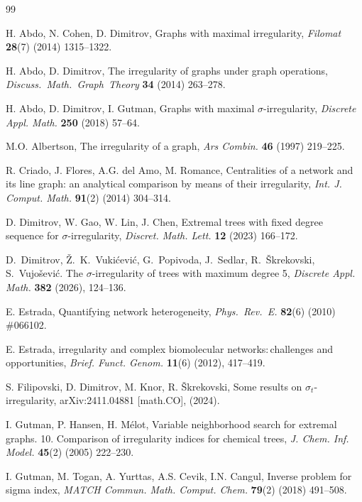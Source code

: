 \documentclass[12pt]{amsart}
\begin{document}
\begin{thebibliography}{99}

 H. Abdo, N. Cohen, D. Dimitrov, Graphs with maximal irregularity, \emph{Filomat} \textbf{28}(7) (2014) 1315--1322.

 H. Abdo, D. Dimitrov, The irregularity of graphs under graph operations, \emph{Discuss.~Math.~Graph~Theory} \textbf{34} (2014) 263--278.

 H. Abdo, D. Dimitrov, I. Gutman, Graphs with maximal $\sigma$-irregularity, \emph{Discrete Appl. Math.} \textbf{250} (2018) 57--64.


 M.O. Albertson, The irregularity of a graph, \emph{Ars Combin.} \textbf{46} (1997) 219--225.

 R. Criado, J. Flores, A.G. del Amo, M. Romance, Centralities of a network and its line graph: an analytical comparison by means of their irregularity, \emph{Int. J. Comput. Math.} \textbf{91}(2) (2014) 304--314.

 D. Dimitrov, W. Gao, W. Lin, J. Chen, Extremal trees with fixed degree sequence for $\sigma$-irregularity, \emph{Discret. Math. Lett.} \textbf{12} (2023) 166--172.


 D.~Dimitrov, \v{Z}.~K.~Vuki\'cevi\'c, G.~Popivoda, J.~Sedlar, R.~\v{S}krekovski, S.~Vujo\v{s}evi\'c. The $\sigma$-irregularity of trees with maximum degree 5, \emph{Discrete Appl. Math.}  \textbf{382} (2026), 124--136.


 E. Estrada, Quantifying network heterogeneity, \emph{Phys.~Rev.~E.} \textbf{82}(6) (2010) \#066102.

 E. Estrada, irregularity and complex biomolecular networks:\,challenges and opportunities, \emph{Brief. Funct. Genom.} \textbf{11}(6) (2012), 417--419.


 S. Filipovski, D. Dimitrov, M. Knor, R. \v{S}krekovski, Some results on $\sigma_t$-irregularity, arXiv:2411.04881 [math.CO], (2024).

 I. Gutman, P. Hansen, H. M\'elot, Variable neighborhood search for extremal graphs. 10. Comparison of irregularity indices for chemical trees, \emph{J. Chem. Inf. Model.} \textbf{45}(2) (2005) 222--230.

 I. Gutman, M. Togan, A. Yurttas, A.S. Cevik, I.N. Cangul, Inverse problem for sigma index, \emph{MATCH Commun. Math. Comput. Chem.} \textbf{79}(2) (2018) 491--508.


\end{thebibliography}
\end{document}
